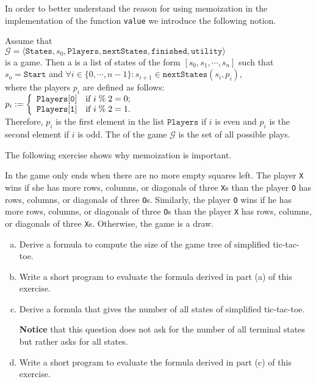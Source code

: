 In order to better understand the reason for using memoization in the implementation of the function
\texttt{value} we introduce the following notion.
\begin{Definition}
  Assume that
  \\[0.2cm]
  \hspace*{1.3cm}
  $\mathcal{G} = \langle \texttt{States}, s_0, \texttt{Players}, \texttt{nextStates}, \texttt{finished},\texttt{utility} \rangle$
  \\[0.2cm]
  is a game. Then a  is a list of states of the form 
  $[s_0, s_1, \cdots, s_n]$ \quad such that
  \\[0.2cm]
  \hspace*{1.3cm} $s_o = \texttt{Start}$ \quad and \quad $\forall i\in\{0,\cdots,n-1\}: s_{i+1} \in \texttt{nextStates}(s_i, p_i)$,
  \\[0.2cm]
  where the players $p_i$ are defined as follows:
  \\[0.2cm]
  \hspace*{1.3cm}
  $p_i := \left\{
  \begin{array}[c]{ll}
    \mathtt{Players[0]} & \mbox{if $i \;\%\; 2 = 0$;} \\
    \mathtt{Players[1]} & \mbox{if $i \;\%\; 2 = 1$.}
  \end{array}
  \right.
  $
  \\[0.2cm]
  Therefore,  $p_i$ is the first element in the list $\texttt{Players}$ if $i$ is even and
  $p_i$ is the second element if $i$ is odd.  The  of the game $\mathcal{G}$ is the set of all
  possible plays.  \eoxs 
\end{Definition}

\noindent
The following exercise shows why memoization is important.

\exercise
In  the game only ends when there are no more empty squares left.
The player \texttt{X} wins if she has more rows, columns, or diagonals of three \texttt{X}s than the player
\texttt{O} has rows, columns, or diagonals of three \texttt{O}s.  Similarly, the player \texttt{O} wins
if he has more rows, columns, or diagonals of three \texttt{O}s than the player \texttt{X} has rows, columns,
or diagonals of three \texttt{X}s.  Otherwise, the game is a draw. 
\begin{enumerate}[(a)]
\item Derive a formula to compute the size of the game tree of simplified tic-tac-toe.
\item Write a short program to evaluate the formula derived in part (a) of this exercise.
\item Derive a formula that gives the number of all states of simplified tic-tac-toe.  

      \textbf{Notice} that this question does not ask for the number of all terminal states but rather asks for
      all states. 
\item Write a short program to evaluate the formula derived in part (c) of this exercise.
      \eox
\end{enumerate}

